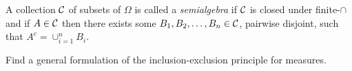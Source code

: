 \begin{definition}
    A collection ${\cal C}$ of subsets of $\Omega$ is called a \textit{semialgebra} if ${\cal C}$ is closed under finite-$\cap$ and if $A\in {\cal C}$ then there exists some $B_1, B_2 , \ldots , B_n \in {\cal C}$, pairwise disjoint, such that $A^c = \cup_{i=1}^{n} B_i$.
    \label{def:semialgebra}
\end{definition}

\begin{exercise}
    Find a general formulation of the inclusion-exclusion principle for measures.
\end{exercise}
